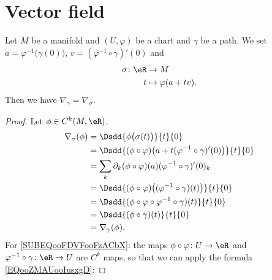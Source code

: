 \section{Vector field}

\begin{lemma}       \label{LEMooXFNQooXwCMNB}
    Let \( M\) be a manifold and \( (U,\varphi)\) be a chart and \( \gamma\) be a path. We set \( a=\varphi^{-1}\big( \gamma(0) \big)\), \(v= (\varphi^{-1}\circ\gamma)'(0)\) and
    \begin{equation}
        \begin{aligned}
            \sigma\colon \eR&\to M \\
            t&\mapsto \varphi(a+tv). 
        \end{aligned}
    \end{equation}
    Then we have \( \nabla_{\gamma}=\nabla_{\sigma}\).   
\end{lemma}

\begin{proof}
    Let \( \phi\in C^k(M, \eR)\). 
    \begin{subequations}
        \begin{align}
            \nabla_{\sigma}(\phi)&=\Dsdd{ \phi\big( \sigma(t) \big) }{t}{0}\\
            &=\Dsdd{ (\phi\circ \varphi)\big( a+t(\varphi^{-1}\circ\gamma)'(0) \big) }{t}{0}\\
            &=\sum_k\partial_k(\phi\circ\varphi)(a)(\varphi^{-1}\circ\gamma)'(0)_k  \label{SUBEQooFDVFooFzACbX}\\
            &=\Dsdd{ (\phi\circ\varphi)\big( (\varphi^{-1}\circ\gamma)(t) \big) }{t}{0}\\
            &=\Dsdd{ (\phi\circ\varphi\circ\varphi^{-1}\circ\gamma)(t) }{t}{0}\\
            &=\Dsdd{ (\phi\circ\gamma)(t) }{t}{0}\\
            &=\nabla_{\gamma}(\phi).
        \end{align}
    \end{subequations}
    For \eqref{SUBEQooFDVFooFzACbX}: the maps \( \phi\circ\varphi\colon U\to \eR\) and \( \varphi^{-1}\circ\gamma\colon \eR\to U\) are \( C^k\) maps, so that we can apply the formula \eqref{EQooZMAUooIusxgD}:
\end{proof}

